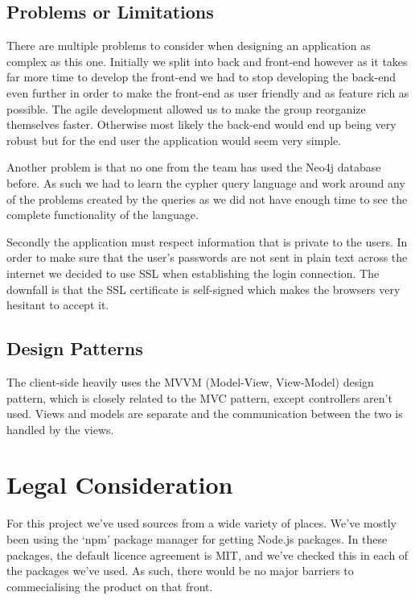 \documentclass[11pt]{article}
\begin{document}
\subsection{Problems or Limitations}

There are multiple problems to consider when designing an application as complex as this one.
Initially we split into back and front-end however as it takes far more time to develop the front-end we had to stop developing the back-end even further in order to make the front-end as user friendly and as feature rich as possible.
The agile development allowed us to make the group reorganize themselves faster. Otherwise most likely the back-end would end up being very robust but for the end user the application would seem very simple.

Another problem is that no one from the team has used the Neo4j database before. As such we had to learn the cypher query language and work around any of the problems created by the queries as we did not have enough time to see the complete functionality of the language.

Secondly the application must respect information that is private to the users. In order to make sure that the user's passwords are not sent in plain text across the internet we decided to use SSL when establishing the login connection.
The downfall is that the SSL certificate is self-signed which makes the browsers very hesitant to accept it.

\subsection{Design Patterns}

The client-side heavily uses the MVVM (Model-View, View-Model) design pattern, which is closely related to the MVC pattern, except controllers aren't used. Views and models are separate and the communication between the two is handled by the views.

\section {Legal Consideration}

For this project we've used sources from a wide variety of places. We've mostly been using the `npm' package manager for getting Node.js packages. In these packages, the default licence agreement is MIT, and we've checked this in each of the packages we've used. As such, there would be no major barriers to commecialising the product on that front.
\end{document}
